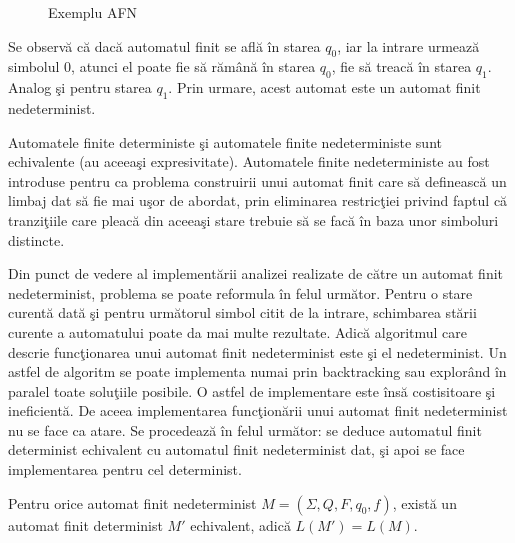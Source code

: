 \begin{figure}[H]
\centering
{}
\caption{Exemplu AFN}
\end{figure}

Se observă că dacă automatul finit se află în starea $q_{0}$, iar la intrare urmează simbolul $0$, atunci el poate fie să rămână în starea $q_{0}$, fie să treacă în starea $q_{1}$. Analog şi pentru starea $q_{1}$. Prin urmare, acest automat este un automat finit nedeterminist.

Automatele finite deterministe şi automatele finite nedeterministe sunt echivalente (au aceeaşi expresivitate). Automatele finite nedeterministe au fost introduse pentru ca problema construirii unui automat finit care să definească un limbaj dat să fie mai uşor de abordat, prin eliminarea restricţiei privind faptul că tranziţiile care pleacă din aceeaşi stare trebuie să se facă în baza unor simboluri distincte. 

Din punct de vedere al implementării analizei realizate de către un automat finit nedeterminist, problema se poate reformula în felul următor. Pentru o stare curentă dată şi pentru următorul simbol citit de la intrare, schimbarea stării curente a automatului poate da mai multe rezultate. Adică algoritmul care descrie funcţionarea unui automat finit nedeterminist este şi el nedeterminist. Un astfel de algoritm se poate implementa numai prin backtracking sau explorând în paralel toate soluţiile posibile. O astfel de implementare este însă costisitoare şi ineficientă. De aceea implementarea funcţionării unui automat finit nedeterminist nu se face ca atare. Se procedează în felul următor: se deduce automatul finit determinist echivalent cu automatul finit nedeterminist dat, şi apoi se face implementarea pentru cel determinist.

\begin{teorema}
Pentru orice automat finit nedeterminist $M=(\Sigma, Q, F, q_{0}, f)$, există un automat finit determinist $M'$ echivalent, adică $L(M') = L(M).$
\end{teorema}


